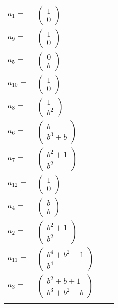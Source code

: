 \documentclass[1p]{elsarticle_modified}
\theoremstyle{definition}
\begin{document}
\begin{tabular}{m{7pt} m{180pt} m{7pt} m{180pt} }
\flushright $a_{1}=$&$\begin{pmatrix}1\\0\end{pmatrix}$ \\
\flushright $a_{9}=$&$\begin{pmatrix}1\\0\end{pmatrix}$ \\
\flushright $a_{5}=$&$\begin{pmatrix}0\\b\end{pmatrix}$ \\
\flushright $a_{10}=$&$\begin{pmatrix}1\\0\end{pmatrix}$ \\
\flushright $a_{8}=$&$\begin{pmatrix}1\\b^2\end{pmatrix}$ \\
\flushright $a_{6}=$&$\begin{pmatrix}b\\b^3+b\end{pmatrix}$ \\
\flushright $a_{7}=$&$\begin{pmatrix}b^2+1\\b^2\end{pmatrix}$ \\
\flushright $a_{12}=$&$\begin{pmatrix}1\\0\end{pmatrix}$ \\
\flushright $a_{4}=$&$\begin{pmatrix}b\\b\end{pmatrix}$ \\
\flushright $a_{2}=$&$\begin{pmatrix}b^2+1\\b^2\end{pmatrix}$ \\
\flushright $a_{11}=$&$\begin{pmatrix}b^4+b^2+1\\b^4\end{pmatrix}$ \\
\flushright $a_{3}=$&$\begin{pmatrix}b^2+b+1\\b^3+b^2+b\end{pmatrix}$\\&\end{tabular}
\end{document}
